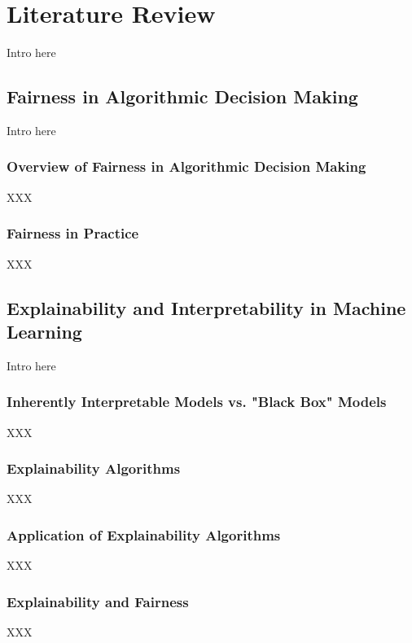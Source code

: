 \chapter{Literature Review}\label{chap:lit}

Intro here

\section{Fairness in Algorithmic Decision Making} \label{sec:fairness}

Intro here

\subsection{Overview of Fairness in Algorithmic Decision Making} \label{subsec:overview}

XXX

\subsection{Fairness in Practice} \label{subsec:practice}

XXX

\section{Explainability and Interpretability in Machine Learning} \label{sec:explainability}

Intro here

\subsection{Inherently Interpretable Models vs. "Black Box" Models} \label{subsec:inherently}

XXX

\subsection{Explainability Algorithms} \label{subsec:algorithms}

XXX

\subsection{Application of Explainability Algorithms} \label{subsec:application}

XXX

\subsection{Explainability and Fairness} \label{subsec:explainability_fairness}

XXX